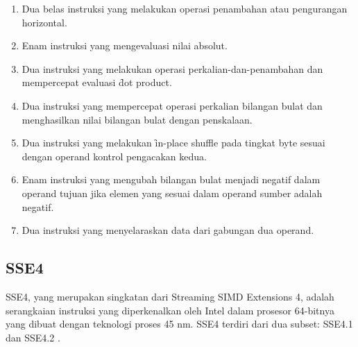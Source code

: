 \begin{enumerate}
	\item Dua belas instruksi yang melakukan operasi penambahan atau pengurangan horizontal.
	\item Enam instruksi yang mengevaluasi nilai absolut.
	\item Dua instruksi yang melakukan operasi perkalian-dan-penambahan dan mempercepat evaluasi \f{dot product}.
	\item Dua instruksi yang mempercepat operasi perkalian bilangan bulat dan menghasilkan nilai bilangan bulat dengan penskalaan.
	\item Dua instruksi yang melakukan \f{in-place shuffle} pada tingkat byte sesuai dengan operand kontrol pengacakan kedua.
	\item Enam instruksi yang mengubah bilangan bulat menjadi negatif dalam operand tujuan jika elemen yang sesuai dalam operand sumber adalah negatif.
	\item Dua instruksi yang menyelaraskan data dari gabungan dua operand.
\end{enumerate}

\subsection{SSE4}
SSE4, yang merupakan singkatan dari Streaming SIMD Extensions 4, adalah serangkaian instruksi yang diperkenalkan oleh Intel dalam prosesor 64-bitnya yang dibuat dengan teknologi proses 45 nm. SSE4 terdiri dari dua subset: SSE4.1 dan SSE4.2 \cite{sse4reference}.

